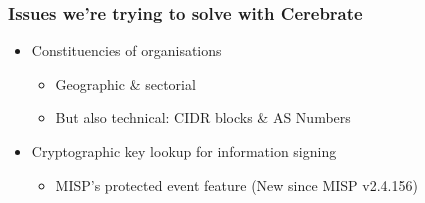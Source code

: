 \begin{frame}
\frametitle{Issues we're trying to solve with Cerebrate}
    \begin{minipage}{0.8\textwidth}
        \begin{itemize}
            \item Constituencies of organisations
            \begin{itemize}
                \item Geographic \& sectorial
                \item But also technical: CIDR blocks \& AS Numbers
            \end{itemize}
            \item Cryptographic key lookup for information signing
            \begin{itemize}
                \item MISP's protected event feature (New since MISP v2.4.156)
            \end{itemize}
        \end{itemize}
    \end{minipage}
    \begin{minipage}{0.19\textwidth}

\end{minipage}
\end{frame}
